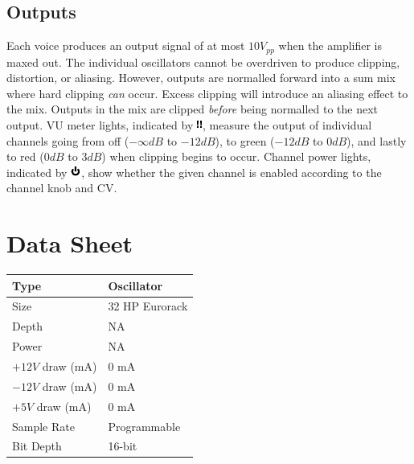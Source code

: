 \documentclass[12pt,letter]{article}
\begin{document}
\subsection{Outputs}

Each voice produces an output signal of at most $10V_{pp}$ when the amplifier is maxed out. The individual oscillators cannot be overdriven to produce clipping, distortion, or aliasing. However, outputs are normalled forward into a sum mix where hard clipping \textit{can} occur. Excess clipping will introduce an aliasing effect to the mix. Outputs in the mix are clipped \textit{before} being normalled to the next output. VU meter lights, indicated by \includegraphics[height=\baselineskip]{img/VU}, measure the output of individual channels going from off ($-\infty dB$ to $-12dB$), to green ($-12dB$ to $0dB$), and lastly to red ($0dB$ to $3dB$) when clipping begins to occur. Channel power lights, indicated by \includegraphics[height=\baselineskip]{img/OnOff}, show whether the given channel is enabled according to the channel knob and CV.


\clearpage
\section{Data Sheet}

\begin{table}[!htp]
\begin{tabular}{|l|l|}
\hline
Type             & Oscillator               \\
\hline
Size             & 32 HP Eurorack           \\
\hline
Depth            & NA                       \\
\hline
Power            & NA                       \\ %
\hline
$+12V$ draw (mA) & 0 mA                     \\
\hline
$-12V$ draw (mA) & 0 mA                     \\
\hline
$+5V$ draw (mA)  & 0 mA                     \\
\hline
Sample Rate      & Programmable             \\
\hline
Bit Depth        & 16-bit                   \\
\hline
\end{tabular}
\end{table}


\clearpage
\renewcommand\refname{References}
\nocite{*}


\end{document}
